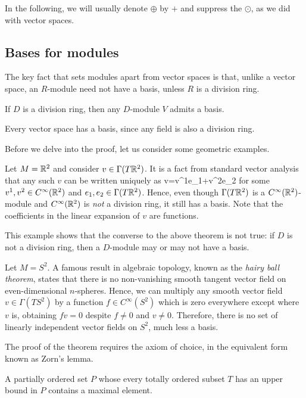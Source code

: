 In the following, we will usually denote $\oplus$ by $+$ and suppress the $\odot$, as we did with vector spaces.

\subsection{Bases for modules}

The key fact that sets modules apart from vector spaces is that, unlike a vector space, an $R$-module need not have a basis, unless $R$ is a division ring. 

\begin{theorem}
\label{thm:everybasis}
If $D$ is a division ring, then any $D$-module $V$ admits a basis.
\end{theorem}

\bc
Every vector space has a basis, since any field is also a division ring.
\ec

Before we delve into the proof, let us consider some geometric examples.

\be
\ben[label=\alph*)]
\item Let $M = \mathbb{R}^2$ and consider $v\in \Gamma(T\mathbb{R}^2)$. It is a fact from standard vector analysis that any such $v$ can be written uniquely as
\bse
v=v^1e_1+v^2e_2
\ese
for some $v^1,v^2\in C^\infty(\mathbb{R}^2)$ and $e_1,e_2\in \Gamma(T\mathbb{R}^2)$. Hence, even though $\Gamma(T\mathbb{R}^2)$ is a $C^\infty(\mathbb{R}^2)$-module and $C^\infty(\mathbb{R}^2)$ is \emph{not} a division ring, it still has a basis. Note that the coefficients in the linear expansion of $v$ are functions.

This example shows that the converse to the above theorem is not true: if $D$ is not a division ring, then a $D$-module may or may not have a basis.

\item Let $M=S^2$. A famous result in algebraic topology, known as the \emph{hairy ball theorem}, states that there is no non-vanishing smooth tangent vector field on even-dimensional $n$-spheres. Hence, we can multiply any smooth vector field $v\in\Gamma(TS^2)$ by a function $f\in C^\infty(S^2)$ which is zero everywhere except where $v$ is, obtaining $fv=0$ despite $f\neq 0$ and $v\neq 0$. Therefore, there is no set of linearly independent vector fields on $S^2$, much less a basis.
\een
\ee

The proof of the theorem requires the axiom of choice, in the equivalent form known as Zorn's lemma.

\bl[Zorn]
A partially ordered set $P$ whose every totally ordered subset $T$ has an upper bound in $P$ contains a maximal element.
\el

